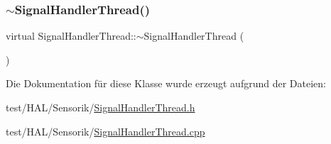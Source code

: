 \hypertarget{class_signal_handler_thread_ae5f82b0b55704aba1cbf0e06002b2737}{}\label{class_signal_handler_thread_ae5f82b0b55704aba1cbf0e06002b2737} 
\subsubsection{\texorpdfstring{$\sim$\+Signal\+Handler\+Thread()}{~SignalHandlerThread()}\hspace{0.1cm}{\footnotesize\ttfamily [2/2]}}
{\footnotesize\ttfamily virtual Signal\+Handler\+Thread\+::$\sim$\+Signal\+Handler\+Thread (\begin{DoxyParamCaption}{ }\end{DoxyParamCaption})\hspace{0.3cm}{\ttfamily [virtual]}}



Die Dokumentation für diese Klasse wurde erzeugt aufgrund der Dateien\+:\begin{DoxyCompactItemize}
\item 
test/\+H\+A\+L/\+Sensorik/\hyperlink{test_2_h_a_l_2_sensorik_2_signal_handler_thread_8h}{Signal\+Handler\+Thread.\+h}\item 
test/\+H\+A\+L/\+Sensorik/\hyperlink{test_2_h_a_l_2_sensorik_2_signal_handler_thread_8cpp}{Signal\+Handler\+Thread.\+cpp}\end{DoxyCompactItemize}
